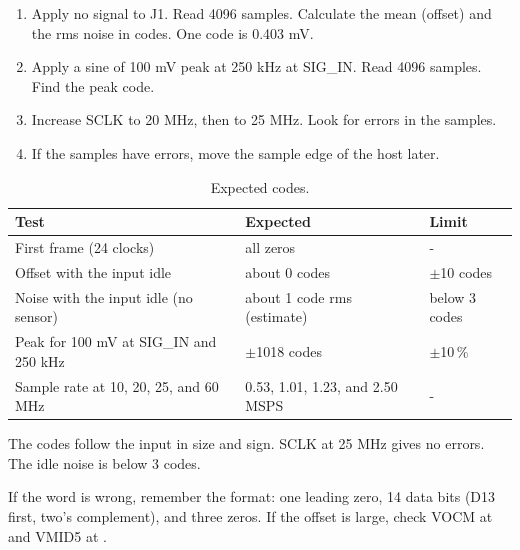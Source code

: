 \clearpage
\begin{samepage}
\begin{enumerate}
\item Apply no signal to J1. Read 4096 samples. Calculate the mean (offset) and the rms noise in codes. One code is 0.403 mV.
\item Apply a sine of 100 mV peak at 250 kHz at SIG\_IN. Read 4096 samples. Find the peak code.
\item Increase SCLK to 20 MHz, then to 25 MHz. Look for errors in the samples.
\item If the samples have errors, move the sample edge of the host later.
\end{enumerate}
\begin{table}[H]
\caption{Expected codes.}
\small\begin{tabular}{@{}lll@{}}
\toprule Test & Expected & Limit\\\midrule
First frame (24 clocks) & all zeros & -\\
Offset with the input idle & about 0 codes & $\pm$10 codes\\
Noise with the input idle (no sensor) & about 1 code rms (estimate) & below 3 codes\\
Peak for 100 mV at SIG\_IN and 250 kHz & $\pm$1018 codes & $\pm$10\,\%\\
Sample rate at 10, 20, 25, and 60 MHz & 0.53, 1.01, 1.23, and 2.50 MSPS & -\\
\bottomrule\end{tabular}
\end{table}
\begin{pass}The codes follow the input in size and sign. SCLK at 25 MHz gives no errors. The idle noise is below 3 codes.\end{pass}
\begin{fail}If the word is wrong, remember the format: one leading zero, 14 data bits (D13 first, two's complement), and three zeros. If the offset is large, check VOCM at  and VMID5 at .\end{fail}
\end{samepage}

